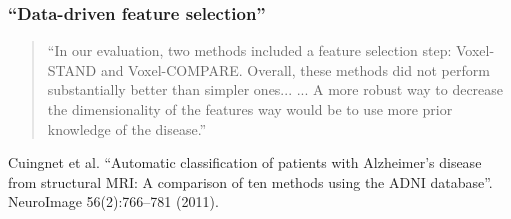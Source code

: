 \begin{frame}
\frametitle{``Data-driven feature selection''}
\begin{quote}
``In our evaluation, two methods included a feature selection step: Voxel-STAND and Voxel-COMPARE.
Overall, these methods did not perform substantially better than simpler ones... ...
A more robust way to decrease the dimensionality of the features way would be to use more prior knowledge of the disease.''


\end{quote}

\begin{center}
\begin{tiny}
Cuingnet et al. ``Automatic classification of patients with Alzheimer's disease from structural MRI: A comparison of ten methods using the ADNI database''.  NeuroImage 56(2):766--781 (2011).\par
\end{tiny}
\end{center}
\end{frame}




